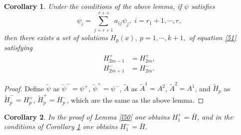 \documentclass[a4paper,reqno,11pt]{amsart}
\numberwithin{equation}{section} %
\newtheorem*{cor}{Corollary}
\begin{document}
\begin{cor}\label{l51}
	Under the conditions of the above lemma, if $\psi$ satisfies
	\begin{equation}\label{515}
		\psi _i=\sum_{j=r+1}^{r+s}{a_{ij}\psi _j ,\,\,i=r_1+1,\cdots ,r,}
	\end{equation}
	then there exists a set of solutions $H_p (x),\ p = 1, \cdots , k+1,$ of equation \eqref{51} satisfying
	\begin{align}
		H^{+}_{2m-1} &= H^{+}_{2m}\label{516} ,\\
		H^{-}_{2m+1} &= H^{-}_{2m}\label{517} .
	\end{align}
\end{cor}
\begin{proof}
	Define $\tilde{\psi} $ as $\tilde{\psi}^{-}=\psi ^{+}$, $\tilde{\psi}^{+}=\psi ^{-}$, $\tilde{A}$ as $\tilde{A}^{1}=A ^{2}$, $\tilde{A}^{2}=A ^{1}$, and $\tilde{H}_p$ as $\tilde{H}_p^{-}=H_p ^{+}$, $\tilde{H}_p^{+}=H_p ^{-}$, which are the same as the above lemma. 
\end{proof}
\begin{cor}\label{l52}
	In the proof of Lemma \ref{l50} one obtains $H_1^{+}=\bar{H} $, and in the conditions of Corollary \ref{l51} one obtains $H_1^{-}=\bar{H} $.
\end{cor}






%
%
%



%
%
%
%
%
%
%
%
\end{document}
